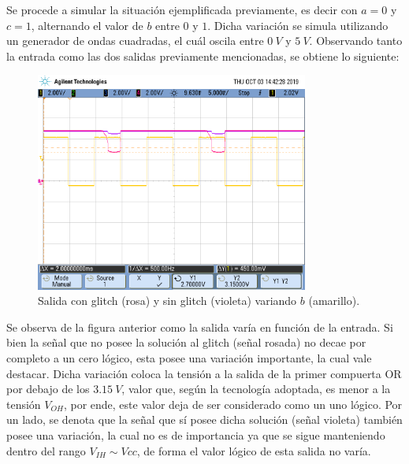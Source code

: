 Se procede a simular la situación ejemplificada previamente, es decir con  $a = 0$ y $c = 1$, alternando el valor de $b$ entre $0$ y $1$. Dicha variación se simula utilizando un generador de ondas cuadradas, el cuál oscila entre $0 \ V$ y $5 \ V$. Observando tanto la entrada como las dos salidas previamente mencionadas, se obtiene lo siguiente: 
\begin{figure}[H]
\centering
	\includegraphics[width=0.8\textwidth, trim = {0 0 0 2cm},clip]{ImagenesEjercicio3/scope_5.png}
	\caption{Salida con glitch (rosa) y sin glitch (violeta) variando $b$ (amarillo).}
	\label{fig:medicion}
\end{figure}

Se observa de la figura anterior como la salida varía en función de la entrada. Si bien la señal que no posee la solución al glitch (señal rosada) no decae por completo a un cero lógico, esta posee una variación importante, la cual vale destacar. Dicha variación coloca la tensión a la salida de la primer compuerta OR por debajo de los $3.15 \ V$, valor que, según la tecnología adoptada, es menor a la tensión $V_{OH}$, por ende, este valor deja de ser considerado como un uno lógico. Por un lado, se denota que la señal que sí posee dicha solución (señal violeta) también posee una variación, la cual no es de importancia ya que se sigue manteniendo dentro del rango $V_{IH} \sim Vcc$, de forma el valor lógico de esta salida no varía.

